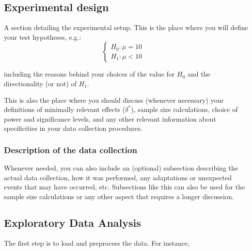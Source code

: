 \documentclass[]{article}
\newenvironment{Shaded}{\begin{snugshade}}{\end{snugshade}}
\newcommand{\ControlFlowTok}[1]{\textcolor[rgb]{0.13,0.29,0.53}{\textbf{#1}}}
\newcommand{\DecValTok}[1]{\textcolor[rgb]{0.00,0.00,0.81}{#1}}
\newcommand{\KeywordTok}[1]{\textcolor[rgb]{0.13,0.29,0.53}{\textbf{#1}}}
\newcommand{\NormalTok}[1]{#1}
\newcommand{\OperatorTok}[1]{\textcolor[rgb]{0.81,0.36,0.00}{\textbf{#1}}}
\newcommand{\StringTok}[1]{\textcolor[rgb]{0.31,0.60,0.02}{#1}}
\begin{document}
\hypertarget{experimental-design}{%
\subsection{Experimental design}\label{experimental-design}}

A section detailing the experimental setup. This is the place where you
will define your test hypotheses, e.g.:
\[\begin{cases} H_0: \mu = 10&\\H_1: \mu<10\end{cases}\]

including the reasons behind your choices of the value for \(H_0\) and
the directionality (or not) of \(H_1\).

This is also the place where you should discuss (whenever necessary)
your definitions of minimally relevant effects (\(\delta^*\)), sample
size calculations, choice of power and significance levels, and any
other relevant information about specificities in your data collection
procedures.

\hypertarget{description-of-the-data-collection}{%
\subsubsection{Description of the data
collection}\label{description-of-the-data-collection}}

Whenever needed, you can also include an (optional) subsection
describing the actual data collection, how it was performed, any
adaptations or unexpected events that may have occurred, etc.
Subsections like this can also be used for the sample size calculations
or any other aspect that requires a longer discussion.

\hypertarget{exploratory-data-analysis}{%
\subsection{Exploratory Data Analysis}\label{exploratory-data-analysis}}

The first step is to load and preprocess the data. For instance,

\begin{Shaded}
\end{Shaded}
\end{document}
